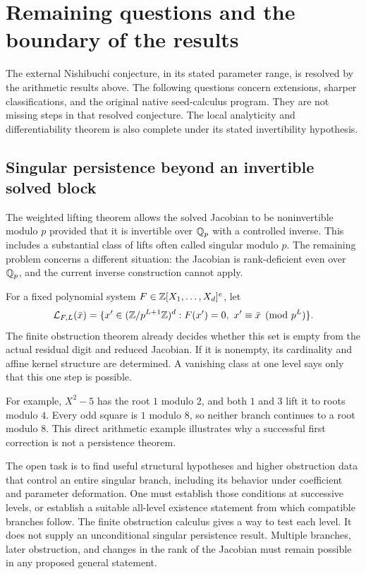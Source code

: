 \section{Remaining questions and the boundary of the results}
\label{sec:open}

The external Nishibuchi conjecture, in its stated parameter range, is resolved
by the arithmetic results above. The following questions concern extensions,
sharper classifications, and the original native seed-calculus program. They
are not missing steps in that resolved conjecture. The local analyticity and
differentiability theorem is also complete under its stated invertibility
hypothesis.

\subsection{Singular persistence beyond an invertible solved block}
\label{subsec:singular-open}

The weighted lifting theorem allows the solved Jacobian to be noninvertible
modulo $p$ provided that it is invertible over $\mathbb Q_p$ with a controlled inverse.
This includes a substantial class of lifts often called singular modulo $p$.
The remaining problem concerns a different situation: the Jacobian is
rank-deficient even over $\mathbb Q_p$, and the current inverse construction cannot
apply.

For a fixed polynomial system $F\in\mathbb Z[X_1,\ldots,X_d]^e$, let
\[
\mathcal L_{F,L}(\bar x)
=\{x'\in(\mathbb Z/p^{L+1}\mathbb Z)^d:
F(x')=0,\ x'\equiv\bar x\pmod{p^L}\}.
\]
The finite obstruction theorem already decides whether this set is empty
from the actual residual digit and reduced Jacobian. If it is nonempty, its
cardinality and affine kernel structure are determined. A vanishing class
at one level says only that this one step is possible.

For example, $X^2-5$ has the root $1$ modulo $2$, and both $1$ and $3$ lift it
to roots modulo $4$. Every odd square is $1$ modulo $8$, so neither branch
continues to a root modulo $8$. This direct arithmetic example illustrates
why a successful first correction is not a persistence theorem.

The open task is to find useful structural hypotheses and higher obstruction
data that control an entire singular branch, including its behavior under
coefficient and parameter deformation. One must establish those conditions
at successive levels, or establish a suitable all-level existence statement
from which compatible branches follow. The finite obstruction calculus gives
a way to test each level. It does not supply an unconditional singular
persistence result. Multiple branches, later obstruction, and changes in the
rank of the Jacobian must remain possible in any proposed general statement.

